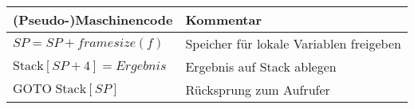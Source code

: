 \documentclass[border=0.2cm, convert={density=600}]{standalone}
\begin{document}
\renewcommand\arraystretch{1.3}
\begin{tabular}{|l|l|}
	\hline\rowcolor{lightgray}
	(Pseudo-)Maschinencode & Kommentar\\
	\hline
	$SP = SP + framesize(f)$ & Speicher für lokale Variablen freigeben\\
	\hline
	$\textrm{Stack}[SP + 4] = \textit{Ergebnis}$ & Ergebnis auf Stack ablegen\\
	\hline
	$\mathrm{GOTO}\; \textrm{Stack}[SP]$ & Rücksprung zum Aufrufer\\
	\hline
\end{tabular}
\end{document}
